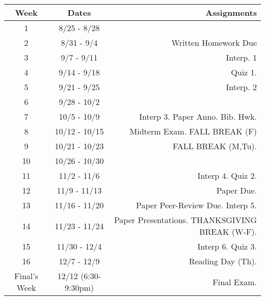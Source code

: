 \documentclass[10pt]{article}
\begin{document}
\begin{center}
\begin{tabular}{|c|c|r|}
\hline 
Week & Dates & Assignments \\
\hline
1 & 8/25 - 8/28 &  \\
\hline 
2 & 8/31 - 9/4 &  Written Homework Due  \\
\hline
3 & 9/7 - 9/11 &   Interp. 1 \\
\hline
4 & 9/14 - 9/18 &   Quiz 1. \\
\hline
5 & 9/21 - 9/25 &  Interp. 2\\
\hline
6 & 9/28 - 10/2 & \\
\hline
7 & 10/5 - 10/9  &  Interp 3. Paper Anno. Bib. Hwk. \\
\hline 
8 & 10/12 - 10/15 & Midterm Exam.  FALL BREAK (F) \\
\hline
9 & 10/21 - 10/23 & FALL BREAK (M,Tu). \\
\hline
10 & 10/26 - 10/30 &  \\
\hline
11 & 11/2 - 11/6 & Interp 4. Quiz 2.\\
\hline
12 & 11/9 - 11/13 &  Paper Due.\\
\hline
13 & 11/16 - 11/20 & Paper Peer-Review Due. Interp 5.\\
\hline
14 & 11/23 - 11/24 &  Paper Presentations. THANKSGIVING BREAK (W-F).   \\
\hline
15 & 11/30 - 12/4 & Interp 6. Quiz 3. \\ 
\hline
16 & 12/7 - 12/9 &   Reading Day (Th). \\
\hline
Final's Week & 12/12 (6:30-9:30pm) & Final Exam. \\ 
\hline
\end{tabular}
\end{center}
\end{document}
